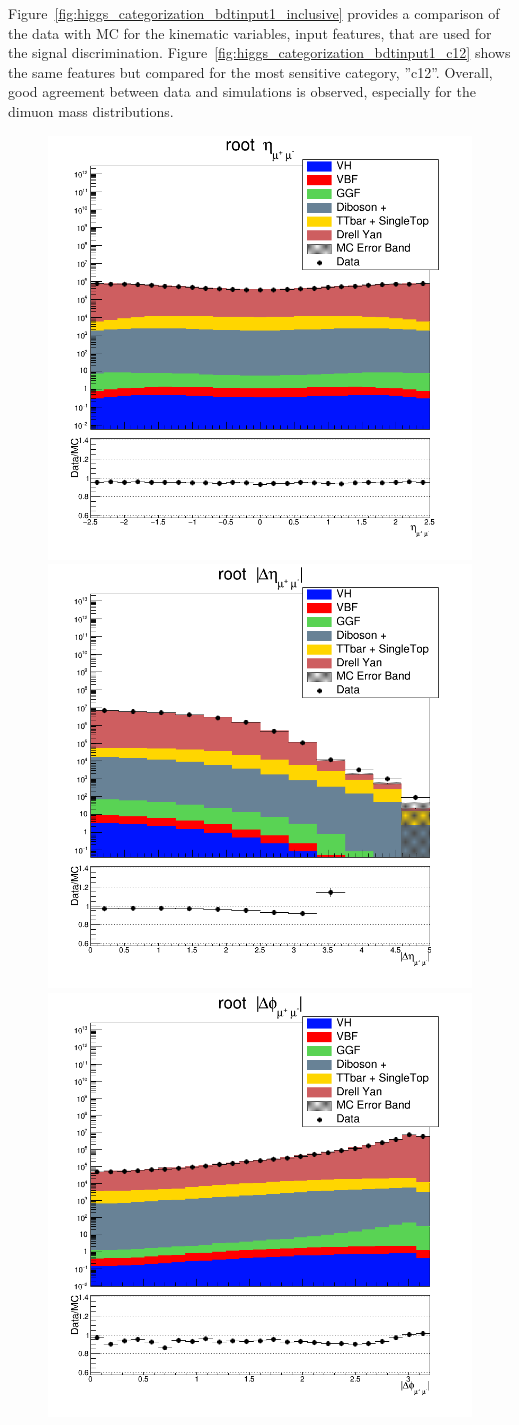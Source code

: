 Figure~\ref{fig:higgs_categorization_bdtinput1_inclusive} provides a comparison of the data with MC for the kinematic variables, input features, that are used for the signal discrimination. Figure~\ref{fig:higgs_categorization_bdtinput1_c12} shows the same features but compared for the most sensitive category, ''c12''. Overall, good agreement between data and simulations is observed, especially for the dimuon mass distributions.
\begin{figure}[htbp]
  \centering
  \includegraphics[width=0.49\linewidth]{figures/bdt_cats/dimu_eta_root.png}
  \includegraphics[width=0.49\linewidth]{figures/bdt_cats/dimu_abs_dEta_root.png}\\
  \includegraphics[width=0.49\linewidth]{figures/bdt_cats/dimu_abs_dPhi_root.png}

\end{figure}

